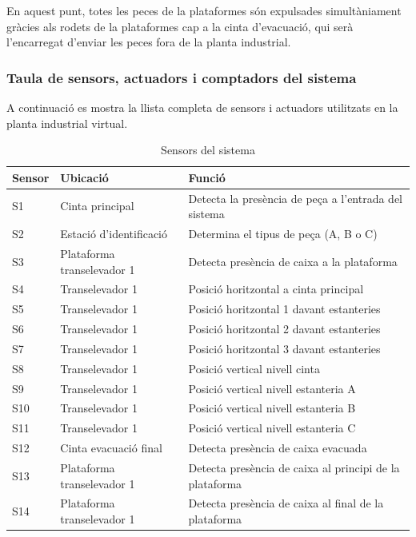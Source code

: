 \documentclass[a4paper,11pt,DIV=13,headings=normal,abstract=true,twoside=semi]{article}
\begin{document}
En aquest punt, totes les peces de la plataformes són expulsades simultàniament gràcies als rodets de la plataformes cap a la cinta d'evacuació, qui serà l'encarregat d'enviar les peces fora de la planta industrial.

\subsubsection{Taula de sensors, actuadors i comptadors del sistema}
\label{sec:tables}
A continuació es mostra la llista completa de sensors i actuadors utilitzats en la planta industrial virtual.

\begin{table}[H]
\centering
\small

\caption{Sensors del sistema}
\label{tab:tab_sensors}
\begin{tabular}{|p{3cm}|p{5cm}|p{6cm}|}

\hline
\textbf{Sensor} & \textbf{Ubicació} & \textbf{Funció} \\ \hline

S1 & Cinta principal & Detecta la presència de peça a l'entrada del sistema \\ \hline
S2 & Estació d'identificació & Determina el tipus de peça (A, B o C) \\ \hline
S3 & Plataforma transelevador 1 & Detecta presència de caixa a la plataforma \\ \hline
S4 & Transelevador 1 & Posició horitzontal a cinta principal \\ \hline
S5 & Transelevador 1 & Posició horitzontal 1 davant estanteries \\ \hline
S6 & Transelevador 1 & Posició horitzontal 2 davant estanteries \\ \hline
S7 & Transelevador 1 & Posició horitzontal 3 davant estanteries \\ \hline
S8 & Transelevador 1 & Posició vertical nivell cinta \\ \hline
S9 & Transelevador 1 & Posició vertical nivell estanteria A \\ \hline
S10 & Transelevador 1 & Posició vertical nivell estanteria B \\ \hline
S11 & Transelevador 1 & Posició vertical nivell estanteria C \\ \hline
S12 & Cinta evacuació final & Detecta presència de caixa evacuada \\ \hline
S13 & Plataforma transelevador 1 & Detecta presència de caixa al principi de la plataforma \\ \hline
S14 & Plataforma transelevador 1 & Detecta presència de caixa  al final de la plataforma \\ \hline


\end{tabular}
\end{table}
\end{document}
